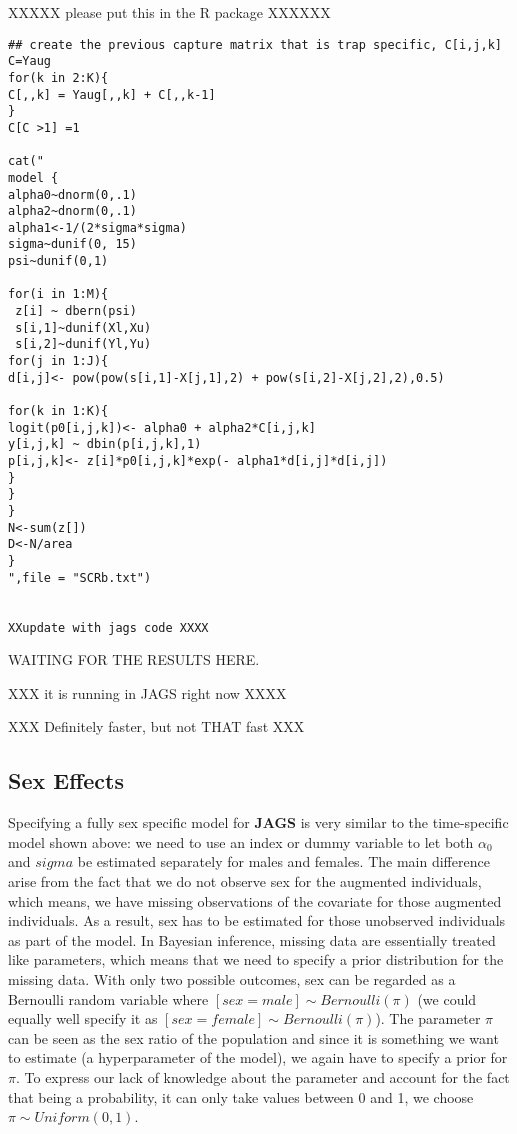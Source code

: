 XXXXX please put this in the R package XXXXXX

{\small
\begin{verbatim}
## create the previous capture matrix that is trap specific, C[i,j,k]
C=Yaug
for(k in 2:K){
C[,,k] = Yaug[,,k] + C[,,k-1]
}
C[C >1] =1

cat("
model {
alpha0~dnorm(0,.1)
alpha2~dnorm(0,.1)
alpha1<-1/(2*sigma*sigma)
sigma~dunif(0, 15)
psi~dunif(0,1)

for(i in 1:M){
 z[i] ~ dbern(psi)
 s[i,1]~dunif(Xl,Xu)
 s[i,2]~dunif(Yl,Yu)
for(j in 1:J){
d[i,j]<- pow(pow(s[i,1]-X[j,1],2) + pow(s[i,2]-X[j,2],2),0.5)

for(k in 1:K){
logit(p0[i,j,k])<- alpha0 + alpha2*C[i,j,k]
y[i,j,k] ~ dbin(p[i,j,k],1)
p[i,j,k]<- z[i]*p0[i,j,k]*exp(- alpha1*d[i,j]*d[i,j])
}
}
}
N<-sum(z[])
D<-N/area
}
",file = "SCRb.txt")


XXupdate with jags code XXXX

\end{verbatim}
}


WAITING FOR THE RESULTS HERE.

XXX it is running in JAGS right now XXXX

XXX Definitely faster, but not THAT fast XXX

\subsection{Sex Effects}
Specifying a fully sex specific model for {\bf JAGS} is very similar to the time-specific model shown above: we need to use an index or dummy variable to let both $\alpha_0$ and $sigma$ be estimated separately for males and females. The main difference arise from the fact that we do not observe sex for the augmented individuals, which means, we have missing observations of the covariate for those augmented individuals. As a result, sex has to be estimated for those unobserved individuals as part of the model. In Bayesian inference, missing data are essentially treated like parameters, which means that we need to specify a prior distribution for the missing data. With only two possible outcomes, sex can be regarded as a Bernoulli random variable where $[sex = male] \sim Bernoulli(\pi)$ (we could equally well specify it as $[sex = female] \sim Bernoulli(\pi)$). The parameter $\pi$ can be seen as the sex ratio of the population and since it is something we want to estimate (a hyperparameter of the model), we again have to specify a prior for $\pi$. To express our lack of knowledge about the parameter and account for the fact that being a probability, it can only take values between 0 and 1, we choose $\pi \sim Uniform(0,1)$.  

